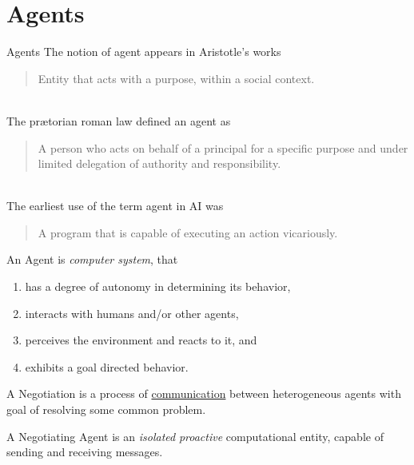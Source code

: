 \section{Agents}

\begin{frame}{Agents}
  The notion of agent appears in Aristotle's works
   \begin{quote}
     Entity that acts with a purpose, within a social context.
   \end{quote}\\\medskip
  The prætorian roman law defined an agent as
    \begin{quote}
      A person who acts on behalf of a principal for
      a specific purpose and under limited delegation of authority and
      responsibility.
    \end{quote}\\\medskip
  The earliest use of the term agent in AI was
    \begin{quote}
      A program that is capable of executing an action vicariously.
    \end{quote}
\end{frame}


\begin{frame}
  \centering
  \begin{block}{An Agent}
    is \emph{computer system}, that
    \begin{enumerate}
      \item has a degree of autonomy in determining its behavior,
      \item interacts with humans and/or other agents,
      \item perceives the environment and reacts to it, and
      \item exhibits a goal directed behavior.
    \end{enumerate}
  \end{block}
  \begin{block}{A Negotiation}
     is a process of \underline{communication} between heterogeneous agents
     with goal of resolving some common problem.
  \end{block}
  \begin{block}{A Negotiating Agent}
     is an \emph{isolated} \emph{proactive} computational entity,
     capable of sending and receiving messages.
  \end{block}
\end{frame}

